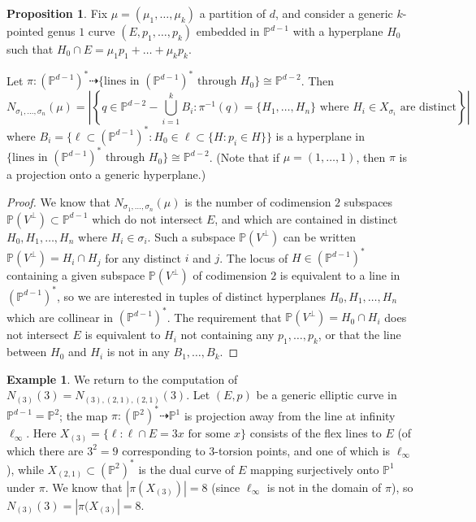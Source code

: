 \documentclass[thesis]{thesis-umich}           %
\renewcommand{\P}{\mathbb P}
\theoremstyle{definition}
\newtheorem{prop}[thm]{Proposition}
\newtheorem{eg}[thm]{Example}
\begin{document}
\begin{prop}
  \label{prop:direct}
  Fix $\mu=(\mu_1,\dots,\mu_k)$ a partition of $d$, and consider
  a generic $k$-pointed
  genus $1$ curve $(E,p_1,\dots,p_k)$ embedded in $\P^{d-1}$ with a hyperplane
  $H_0$ such that $H_0\cap E = \mu_1p_1+\dots+\mu_kp_k$.
  
  Let $\pi:(\P^{d-1})^*\dashrightarrow\{\text{lines in }(\P^{d-1})^*\text{ through }H_0\}\cong \P^{d-2}$. Then
  \[
  N_{\sigma_1,\dots,\sigma_n}(\mu)=\left|\left\{q\in\P^{d-2}-\bigcup_{i=1}^kB_i:\pi^{-1}(q)=\{H_1,\dots,H_n\}\text{ where }H_i\in X_{\sigma_i}\text{ are distinct}\right\}\right|
  \]
  where $B_i=\{\ell\subset(\P^{d-1})^*:H_0\in \ell\subset\{H:p_i\in H\}\}$ is a hyperplane in $\{\text{lines in }(\P^{d-1})^*\text{ through }H_0\}\cong \P^{d-2}$.
     (Note that if $\mu=(1,\dots,1)$, then $\pi$ is a projection onto a generic hyperplane.)
\end{prop}
\begin{proof}
  We know that $N_{\sigma_1,\dots,\sigma_n}(\mu)$ is the number of codimension $2$
  subspaces $\P(V^{\perp})\subset\P^{d-1}$ which do not intersect $E$, and which are contained in distinct $H_0,H_1,\dots,H_n$ where $H_i\in\sigma_i$. Such a subspace
  $\P(V^{\perp})$ can be written $\P(V^{\perp})=H_i\cap H_j$ for any distinct $i$
  and $j$.
  The locus of $H\in(\P^{d-1})^*$ containing
  a given subspace $\P(V^{\perp})$ of codimension $2$ is equivalent to a
  line in $(\P^{d-1})^*$, so we are interested in
  tuples of distinct hyperplanes $H_0,H_1,\dots,H_n$ which are collinear in
  $(\P^{d-1})^*$. The requirement that $\P(V^{\perp})=H_0\cap H_i$ does not intersect $E$ is equivalent to $H_i$ not containing any $p_1,\dots,p_k$, or that
  the line between $H_0$ and $H_i$ is not in any $B_1,\dots,B_k$.
\end{proof}

\begin{eg}
  We return to the computation of $N_{(3)}(3)=N_{(3),(2,1),(2,1)}(3)$. Let $(E,p)$
  be a generic elliptic curve in $\P^{d-1}=\P^2$; the map $\pi:(\P^2)^*\dashrightarrow \P^1$ is projection away from the line at infinity $\ell_{\infty}$.
  Here $X_{(3)}=\{\ell:\ell\cap E=3x\text{ for some }x\}$ consists of the flex lines to $E$ (of which there are $3^2=9$ corresponding to $3$-torsion points, and one of which is $\ell_{\infty}$), while $X_{(2,1)}\subset (\P^2)^*$ is the dual curve of $E$ mapping surjectively onto $\P^1$ under $\pi$. We know that $|\pi(X_{(3)})|=8$ (since $\ell_{\infty}$ is not in the domain of $\pi$), so $N_{(3)}(3)=|\pi(X_{(3)}|=8$.
  \end{eg}
\end{document}
